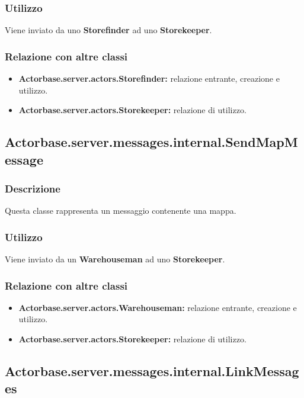 \documentclass[a4paper]{article}
\begin{document}
			\subsubsection{Utilizzo}
				Viene inviato da uno \textbf{Storefinder} ad uno \textbf{Storekeeper}.
				
			\subsubsection{Relazione con altre classi}
				\begin{itemize}
					\item \textbf{Actorbase.server.actors.Storefinder:} relazione entrante, creazione e utilizzo.
					\item \textbf{Actorbase.server.actors.Storekeeper:} relazione di utilizzo.
				\end{itemize}
				
		\subsection{Actorbase.server.messages.internal.SendMapMessage}
			\subsubsection{Descrizione}
				Questa classe rappresenta un messaggio contenente una mappa. 
				
			\subsubsection{Utilizzo}
				Viene inviato da un \textbf{Warehouseman} ad uno \textbf{Storekeeper}.
				
			\subsubsection{Relazione con altre classi}
				\begin{itemize}
					\item \textbf{Actorbase.server.actors.Warehouseman:} relazione entrante, creazione e utilizzo.
					\item \textbf{Actorbase.server.actors.Storekeeper:} relazione di utilizzo.
				\end{itemize}
				
		\subsection{Actorbase.server.messages.internal.LinkMessages}
			
\end{document}
